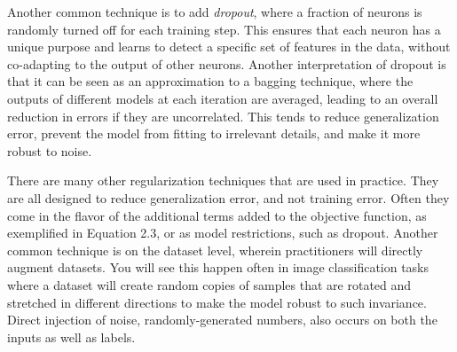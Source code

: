 Another common technique is to add \textit{dropout}, where a fraction of neurons is randomly turned off for each training step.
This ensures that each neuron has a unique purpose and learns to detect a specific set of features in the data, without co-adapting to the output of other neurons.
Another interpretation of dropout is that it can be seen as an approximation to a bagging technique, where the outputs of different models at each iteration are averaged, leading to an overall reduction in errors if they are uncorrelated.
This tends to reduce generalization error, prevent the model from fitting to irrelevant details, and make it more robust to noise.

There are many other regularization techniques that are used in practice. They are all designed to reduce
generalization error, and not training error. Often they come in the flavor of the additional terms added to the
objective function, as exemplified in Equation 2.3, or as model restrictions, such as dropout. Another common technique
is on the dataset level, wherein practitioners will directly augment datasets. You will see this happen often in image classification
tasks where a dataset will create random copies of samples that are rotated and stretched in different directions to make
the model robust to such invariance. Direct injection of noise, randomly-generated numbers, also occurs on both the inputs
as well as labels.
